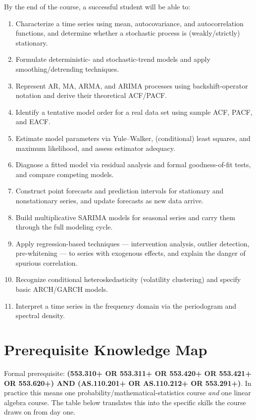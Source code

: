 \documentclass[11pt]{article}
\begin{document}
By the end of the course, a successful student will be able to:

\begin{enumerate}
  \item Characterize a time series using mean, autocovariance, and autocorrelation functions, and
        determine whether a stochastic process is (weakly/strictly) stationary.
  \item Formulate deterministic- and stochastic-trend models and apply smoothing/detrending techniques.
  \item Represent AR, MA, ARMA, and ARIMA processes using backshift-operator notation and derive their
        theoretical ACF/PACF.
  \item Identify a tentative model order for a real data set using sample ACF, PACF, and EACF.
  \item Estimate model parameters via Yule--Walker, (conditional) least squares, and maximum likelihood,
        and assess estimator adequacy.
  \item Diagnose a fitted model via residual analysis and formal goodness-of-fit tests, and compare
        competing models.
  \item Construct point forecasts and prediction intervals for stationary and nonstationary series, and
        update forecasts as new data arrive.
  \item Build multiplicative SARIMA models for seasonal series and carry them through the full modeling
        cycle.
  \item Apply regression-based techniques --- intervention analysis, outlier detection, pre-whitening
        --- to series with exogenous effects, and explain the danger of spurious correlation.
  \item Recognize conditional heteroskedasticity (volatility clustering) and specify basic ARCH/GARCH
        models.
  \item Interpret a time series in the frequency domain via the periodogram and spectral density.
\end{enumerate}

\section{Prerequisite Knowledge Map}

Formal prerequisite: \textbf{(553.310+ OR 553.311+ OR 553.420+ OR 553.421+ OR 553.620+) AND
(AS.110.201+ OR AS.110.212+ OR 553.291+)}. In practice this means one probability/mathematical-statistics
course \emph{and} one linear algebra course. The table below translates this into the specific skills
the course draws on from day one.
\end{document}
